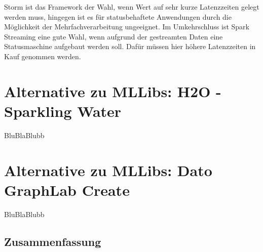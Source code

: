 Storm ist das Framework der Wahl, wenn Wert auf sehr kurze Latenzzeiten gelegt werden muss, hingegen ist es für statusbehaftete Anwendungen durch die Möglichkeit der Mehrfachverarbeitung ungeeignet. Im Umkehrschluss ist Spark Streaming eine gute Wahl, wenn aufgrund der gestreamten Daten eine Statusmaschine aufgebaut werden soll. Dafür müssen hier höhere Latenzzeiten in Kauf genommen werden.     

\section{Alternative zu MLLibs: H2O - Sparkling Water}
\label{section:h20}


BluBlaBlubb


\section{Alternative zu MLLibs: Dato GraphLab Create}
\label{section:h20}


BluBlaBlubb



\subsection{Zusammenfassung}
\label{section:storm}




